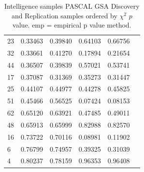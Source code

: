 \begin{table}[ht]
\begin{tabular}{llllll}
  23 & 0.33463 & 0.39840 & 0.64103 & 0.66756 \\ 
  32 & 0.33661 & 0.41270 & 0.17894 & 0.21654 \\ 
  44 & 0.36507 & 0.39839 & 0.57021 & 0.53741 \\ 
  17 & 0.37087 & 0.31369 & 0.35273 & 0.31447 \\ 
  25 & 0.44107 & 0.44977 & 0.44278 & 0.45825 \\ 
  51 & 0.45466 & 0.56525 & 0.07424 & 0.08153 \\ 
  62 & 0.65120 & 0.63921 & 0.47485 & 0.49011 \\ 
  48 & 0.65913 & 0.65999 & 0.82988 & 0.82570 \\ 
  16 & 0.73722 & 0.70116 & 0.08981 & 0.11902 \\ 
  6 & 0.76799 & 0.74957 & 0.39325 & 0.31039 \\ 
  4 & 0.80237 & 0.78159 & 0.96353 & 0.96408 \\ 
   \bottomrule
\end{tabular}
\caption[GSA PASCAL Intelligence]{Intelligence samples PASCAL GSA Discovery and Replication samples ordered by $\chi^2$ $p$ value. emp = empirical p value method.}
\label{tab:Intelligence PASCAL}
\end{table}


